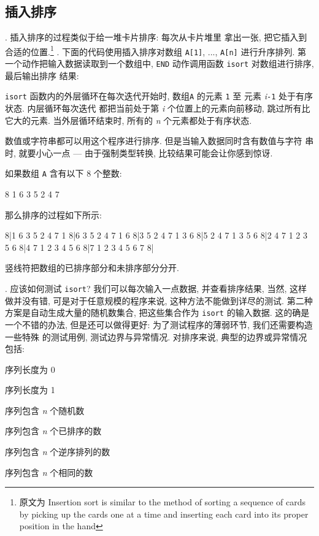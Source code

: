 \subsection{插入排序}
\label{subsec:insertion_sort}
. 插入排序的过程类似于给一堆卡片排序: 每次从卡片堆里
拿出一张, 把它插入到合适的位置.\footnote{原文为 Insertion sort is similar
    to the method of sorting a sequence of cards by picking up the cards
    one at a time and inserting each card into its proper position in the
hand}
. 下面的代码使用插入排序对数组 \texttt{A[1]}, ...,
\texttt{A[n]} 进行升序排列. 第一个动作把输入数据读取到一个数组中,
\texttt{END} 动作调用函数 \texttt{isort} 对数组进行排序, 最后输出排序
结果:
\texttt{isort} 函数内的外层循环在每次迭代开始时, 数组\texttt{A} 的元素
\texttt{1} 至 元素 \textit{i}\texttt{-1} 处于有序状态. 内层循环每次迭代
都把当前处于第 \textit{i} 个位置上的元素向前移动, 跳过所有比它大的元素. 
当外层循环结束时, 所有的 \textit{n} 个元素都处于有序状态.

数值或字符串都可以用这个程序进行排序. 但是当输入数据同时含有数值与字符
串时, 就要小心一点 --- 由于强制类型转换, 比较结果可能会让你感到惊讶.

如果数组 \texttt{A} 含有以下 8 个整数:
\begin{file}
    8 1 6 3 5 2 4 7
\end{file}
那么排序的过程如下所示:
\begin{file}
    8|1 6 3 5 2 4 7
    1 8|6 3 5 2 4 7
    1 6 8|3 5 2 4 7
    1 3 6 8|5 2 4 7
    1 3 5 6 8|2 4 7
    1 2 3 5 6 8|4 7
    1 2 3 4 5 6 8|7
    1 2 3 4 5 6 7 8|
\end{file}
竖线符把数组的已排序部分和未排序部分分开.

. 应该如何测试 \texttt{isort}? 我们可以每次输入一点数据,
并查看排序结果, 当然, 这样做并没有错, 可是对于任意规模的程序来说, 
这种方法不能做到详尽的测试. 第二种方案是自动生成大量的随机数集合, 
把这些集合作为 \texttt{isort} 的输入数据. 这的确是一个不错的办法,
但是还可以做得更好: 为了测试程序的薄弱环节, 我们还需要构造一些特殊
的测试用例, 测试边界与异常情况.
 对排序来说, 典型的边界或异常情况包括:
\begin{pattern}
\indent\indent 序列长度为 0 \par
\indent\indent 序列长度为 1 \par
\indent\indent 序列包含 \textit{n} 个随机数 \par
\indent\indent 序列包含 \textit{n} 个已排序的数 \par
\indent\indent 序列包含 \textit{n} 个逆序排列的数 \par
\indent\indent 序列包含 \textit{n} 个相同的数
\end{pattern}

